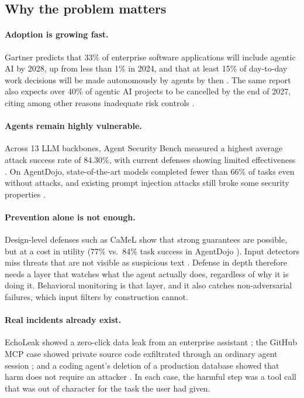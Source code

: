 \documentclass[11pt,a4paper]{article}
\begin{document}
\subsection{Why the problem matters}

\paragraph{Adoption is growing fast.} Gartner predicts that 33\% of enterprise software applications will include agentic AI by 2028, up from less than 1\% in 2024, and that at least 15\% of day-to-day work decisions will be made autonomously by agents by then \citep{gartner2025agentic}. The same report also expects over 40\% of agentic AI projects to be cancelled by the end of 2027, citing among other reasons inadequate risk controls \citep{gartner2025agentic}.

\paragraph{Agents remain highly vulnerable.} Across 13 LLM backbones, Agent Security Bench measured a highest average attack success rate of 84.30\%, with current defenses showing limited effectiveness \citep{zhang2025asb}. On AgentDojo, state-of-the-art models completed fewer than 66\% of tasks even without attacks, and existing prompt injection attacks still broke some security properties \citep{debenedetti2024agentdojo}.

\paragraph{Prevention alone is not enough.} Design-level defenses such as CaMeL show that strong guarantees are possible, but at a cost in utility (77\% vs.\ 84\% task success in AgentDojo \citep{debenedetti2025camel}). Input detectors miss threats that are not visible as suspicious text \citep{debenedetti2024agentdojo}. Defense in depth therefore needs a layer that watches what the agent actually does, regardless of why it is doing it. Behavioral monitoring is that layer, and it also catches non-adversarial failures, which input filters by construction cannot.

\paragraph{Real incidents already exist.} EchoLeak showed a zero-click data leak from an enterprise assistant \citep{thn2025echoleak}; the GitHub MCP case showed private source code exfiltrated through an ordinary agent session \citep{invariant2025github}; and a coding agent's deletion of a production database showed that harm does not require an attacker \citep{eweek2025replit,aiid2025replit}. In each case, the harmful step was a tool call that was out of character for the task the user had given.
\end{document}
